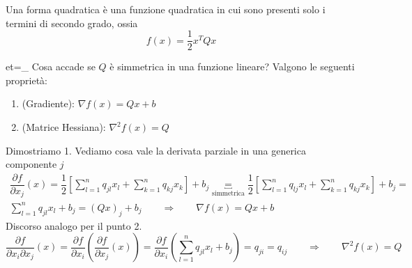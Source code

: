 \begin{notes}
Una forma quadratica \`e una funzione quadratica in cui
sono presenti solo i termini di secondo grado, ossia
$$f(x) =  \frac{1}{2} x^{T} Q x $$
\end{notes}
et{=}_{}
\label{obs:gradiente-hessiana-funzione-quadratica}
Cosa accade se $Q$ \`e simmetrica in una funzione lineare?
Valgono le seguenti propriet\`a:
\begin{enumerate}
\item (Gradiente): $\nabla f(x) = Qx + b$
\item(Matrice Hessiana): $\nabla^{2}f(x) = Q$
\end{enumerate}
Dimostriamo 1. Vediamo cosa vale la derivata parziale in una generica
componente $j$
$$
\begin{array}{c}
\dfrac{\partial f}{\partial x_j}(x) =
\dfrac{1}{2}
\left[\displaystyle \sum_{l=1}^{n} q_{jl}x_l 
+
\sum_{k=1}^{n} q_{kj}x_k
\right] + b_j \underbracket{=}_{\text{simmetrica}}
\dfrac{1}{2}
\left[\displaystyle \sum_{l=1}^{n} q_{lj}x_l 
+
\sum_{k=1}^{n} q_{kj}x_k
\right] + b_j = \\
\displaystyle \sum_{l=1}^{n} q_{jl}x_l + b_j =
(Qx)_j + b_j  \qquad \Longrightarrow \qquad 
\nabla f(x) = Qx + b
\end{array}
$$
Discorso analogo per il punto 2.
$$
\dfrac{\partial f}{\partial x_i \partial x_j}(x) 
= 
\dfrac{\partial f}{\partial x_i}
\left(\dfrac{\partial f}{\partial x_j}(x) 
\right)
=
\dfrac{\partial f}{\partial x_i}
\left(
\displaystyle \sum_{l=1}^{n} q_{jl} x_{l} + b_j 
\right) = q_{ji} = q_{ij}
\qquad \Longrightarrow \qquad \nabla^{2}f(x) = Q
$$

